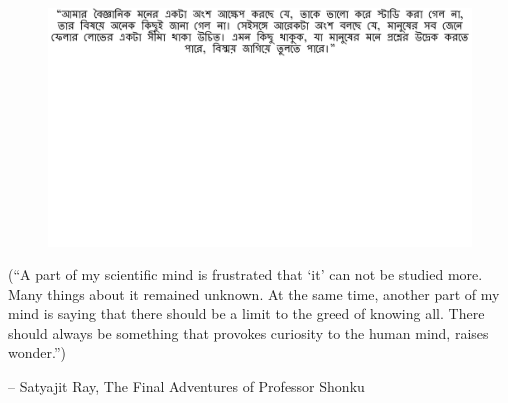 \thispagestyle{empty}
{}

\vspace*{3cm}

\begin{center}
\begin{figure}
  \centering
  	\vspace{5cm}
    \includegraphics[width=\linewidth]{preamble/quote_1.pdf} 
\end{figure}
\vspace{-4cm}
\small
(``A part of my scientific mind is frustrated that `it' can not be studied more. Many things about it remained unknown. At the same time, another part of my mind is saying that there should be a limit to the greed of knowing all. There should always be something that provokes curiosity to the human mind, raises wonder.'')

\vspace{2em}
 -- Satyajit Ray, The Final Adventures of Professor Shonku 
\end{center}

\medskip
